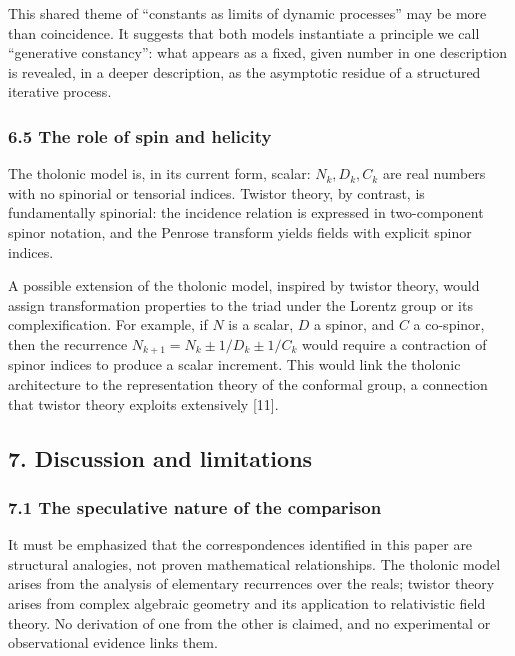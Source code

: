 \documentclass[
  11pt,
  letterpaper,
]{article}
\begin{document}
This shared theme of ``constants as limits of dynamic processes'' may be
more than coincidence. It suggests that both models instantiate a
principle we call ``generative constancy'': what appears as a fixed,
given number in one description is revealed, in a deeper description, as
the asymptotic residue of a structured iterative process.

\subsubsection{6.5 The role of spin and
helicity}\label{the-role-of-spin-and-helicity}

The tholonic model is, in its current form, scalar: \(N_k, D_k, C_k\)
are real numbers with no spinorial or tensorial indices. Twistor theory,
by contrast, is fundamentally spinorial: the incidence relation is
expressed in two-component spinor notation, and the Penrose transform
yields fields with explicit spinor indices.

A possible extension of the tholonic model, inspired by twistor theory,
would assign transformation properties to the triad under the Lorentz
group or its complexification. For example, if \(N\) is a scalar, \(D\)
a spinor, and \(C\) a co-spinor, then the recurrence
\(N_{k+1} = N_k \pm 1/D_k \pm 1/C_k\) would require a contraction of
spinor indices to produce a scalar increment. This would link the
tholonic architecture to the representation theory of the conformal
group, a connection that twistor theory exploits extensively {[}11{]}.

\subsection{7. Discussion and
limitations}\label{discussion-and-limitations}

\subsubsection{7.1 The speculative nature of the
comparison}\label{the-speculative-nature-of-the-comparison}

It must be emphasized that the correspondences identified in this paper
are structural analogies, not proven mathematical relationships. The
tholonic model arises from the analysis of elementary recurrences over
the reals; twistor theory arises from complex algebraic geometry and its
application to relativistic field theory. No derivation of one from the
other is claimed, and no experimental or observational evidence links
them.
\end{document}
